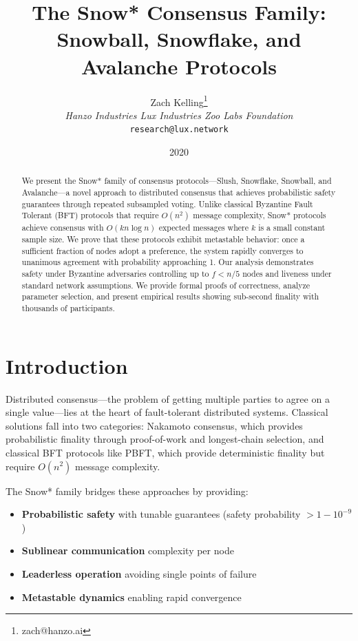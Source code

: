 \documentclass[11pt,a4paper]{article}
\title{The Snow* Consensus Family: Snowball, Snowflake, and Avalanche Protocols}
\author{Zach Kelling\thanks{zach@hanzo.ai} \\ \textit{Hanzo Industries \quad Lux Industries \quad Zoo Labs Foundation} \\ \texttt{research@lux.network}}
\date{2020}
\begin{document}
\maketitle

\begin{abstract}
We present the Snow* family of consensus protocols---Slush, Snowflake, Snowball, and Avalanche---a novel approach to distributed consensus that achieves probabilistic safety guarantees through repeated subsampled voting. Unlike classical Byzantine Fault Tolerant (BFT) protocols that require $O(n^2)$ message complexity, Snow* protocols achieve consensus with $O(kn \log n)$ expected messages where $k$ is a small constant sample size. We prove that these protocols exhibit metastable behavior: once a sufficient fraction of nodes adopt a preference, the system rapidly converges to unanimous agreement with probability approaching 1. Our analysis demonstrates safety under Byzantine adversaries controlling up to $f < n/5$ nodes and liveness under standard network assumptions. We provide formal proofs of correctness, analyze parameter selection, and present empirical results showing sub-second finality with thousands of participants.
\end{abstract}

\section{Introduction}

Distributed consensus---the problem of getting multiple parties to agree on a single value---lies at the heart of fault-tolerant distributed systems. Classical solutions fall into two categories: Nakamoto consensus, which provides probabilistic finality through proof-of-work and longest-chain selection, and classical BFT protocols like PBFT, which provide deterministic finality but require $O(n^2)$ message complexity.

The Snow* family bridges these approaches by providing:
\begin{itemize}
    \item \textbf{Probabilistic safety} with tunable guarantees (safety probability $> 1 - 10^{-9}$)
    \item \textbf{Sublinear communication} complexity per node
    \item \textbf{Leaderless operation} avoiding single points of failure
    \item \textbf{Metastable dynamics} enabling rapid convergence
\end{itemize}
\end{document}
